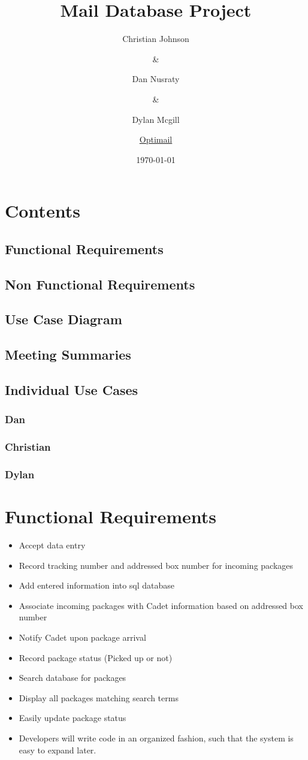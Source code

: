 \documentclass[11pt]{article}
\author{Christian Johnson\and\&\and Dan Nusraty\and\&\and Dylan Mcgill\and \newline \uline{Optimail}}
\date{\today}
\title{Mail Database Project}
\begin{document}
\maketitle
\section{Contents}
\label{sec:org8133741}
\subsection{Functional Requirements}
\label{sec:org869b707}
\subsection{Non Functional Requirements}
\label{sec:org86a4da2}
\subsection{Use Case Diagram}
\label{sec:org6814ada}
\subsection{Meeting Summaries}
\label{sec:org9619fd4}
\subsection{Individual Use Cases}
\label{sec:org72e3f60}
\subsubsection{Dan}
\label{sec:org7b9a607}
\subsubsection{Christian}
\label{sec:org0446cec}
\subsubsection{Dylan}
\label{sec:org0ce7861}
\clearpage
\section*{Functional Requirements}
\label{sec:org87a4164}
\begin{itemize}
\item Accept data entry
\item Record tracking number and addressed box number for incoming packages
\item Add entered information into sql database
\item Associate incoming packages with Cadet information based on addressed box number
\item Notify Cadet upon package arrival
\item Record package status (Picked up or not)
\item Search database for packages
\item Display all packages matching search terms
\item Easily update package status
\item Developers will write code in an organized fashion, such that the system is easy to expand later.
\end{itemize}
\end{document}
